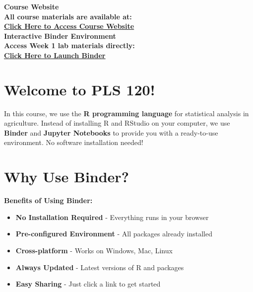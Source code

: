 \documentclass[11pt,a4paper]{article}
\begin{document}
\begin{tcolorbox}[colback=accentgreen!20, colframe=primarygreen, boxrule=2pt, arc=5pt, title={\textbf{\Large Essential Course Resources}}]
\centering
\textbf{\Large Course Website}\\[0.5cm]
\textcolor{primarygreen}{\textbf{All course materials are available at:}}\\[0.3cm]
\href{https://mohammadrezanarimaniucdavis.github.io/PLS120-Statistics-Lab-Materials/}{\textbf{\Large \textcolor{primarygreen}{\underline{Click Here to Access Course Website}}}}\\[0.8cm]

\textbf{\Large Interactive Binder Environment}\\[0.5cm]
\textcolor{primarygreen}{\textbf{Access Week 1 lab materials directly:}}\\[0.3cm]
\href{https://mybinder.org/v2/gh/MohammadrezaNarimaniUCDavis/PLS120-Statistics-Lab-Materials/binder-week1}{\textbf{\Large \textcolor{primarygreen}{\underline{Click Here to Launch Binder}}}}
\end{tcolorbox}

\section{Welcome to PLS 120!}

In this course, we use the \textbf{R programming language} for statistical analysis in agriculture. Instead of installing R and RStudio on your computer, we use \textbf{Binder} and \textbf{Jupyter Notebooks} to provide you with a ready-to-use environment. No software installation needed!

\section{Why Use Binder?}

\begin{infobox}
\textbf{Benefits of Using Binder:}
\begin{itemize}[leftmargin=*]
    \item \textbf{No Installation Required} - Everything runs in your browser
    \item \textbf{Pre-configured Environment} - All packages already installed
    \item \textbf{Cross-platform} - Works on Windows, Mac, Linux
    \item \textbf{Always Updated} - Latest versions of R and packages
    \item \textbf{Easy Sharing} - Just click a link to get started
\end{itemize}
\end{infobox}
\end{document}
